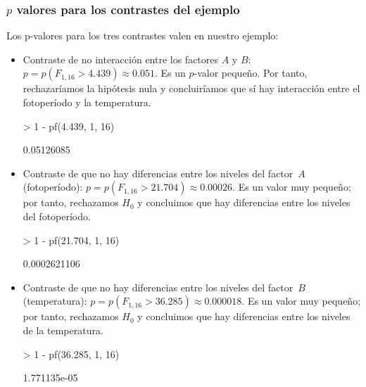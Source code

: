 \begin{frame}[fragile]
\frametitle{$p$ valores para los contrastes del ejemplo}
Los p-valores para los tres contrastes valen en nuestro ejemplo:
{\footnotesize
\begin{itemize}
\item<2-> Contraste de no interacción entre los factores $A$ y $B$: $p=p(F_{1,16} > 4.439)\approx 0.051$. Es un $p$-valor pequeño. Por tanto, rechazaríamos la hipótesis nula y concluiríamos que sí hay interacción entre el fotoperíodo y la temperatura.
\begin{Schunk}
\begin{Sinput}
> 1 - pf(4.439, 1, 16)
\end{Sinput}
\begin{Soutput}
[1] 0.05126085
\end{Soutput}
\end{Schunk}
\item<3-> Contraste de que no hay diferencias entre los niveles del factor~$A$ (fotoperíodo): $p=p(F_{1,16}>21.704)\approx 0.00026$. Es un valor muy
pequeño; por tanto, rechazamos $H_0$ y concluimos que hay diferencias entre los niveles del fotoperíodo.
\begin{Schunk}
\begin{Sinput}
> 1 - pf(21.704, 1, 16)
\end{Sinput}
\begin{Soutput}
[1] 0.0002621106
\end{Soutput}
\end{Schunk}
\item<4-> Contraste de que no hay diferencias entre los niveles del factor~$B$ (temperatura): $p=p(F_{1,16}>36.285)\approx 0.000018$. Es un valor muy
pequeño; por tanto, rechazamos $H_0$ y concluimos que hay diferencias entre los niveles de la temperatura.
\begin{Schunk}
\begin{Sinput}
> 1 - pf(36.285, 1, 16)
\end{Sinput}
\begin{Soutput}
[1] 1.771135e-05
\end{Soutput}
\end{Schunk}
\end{itemize}}
\end{frame}
